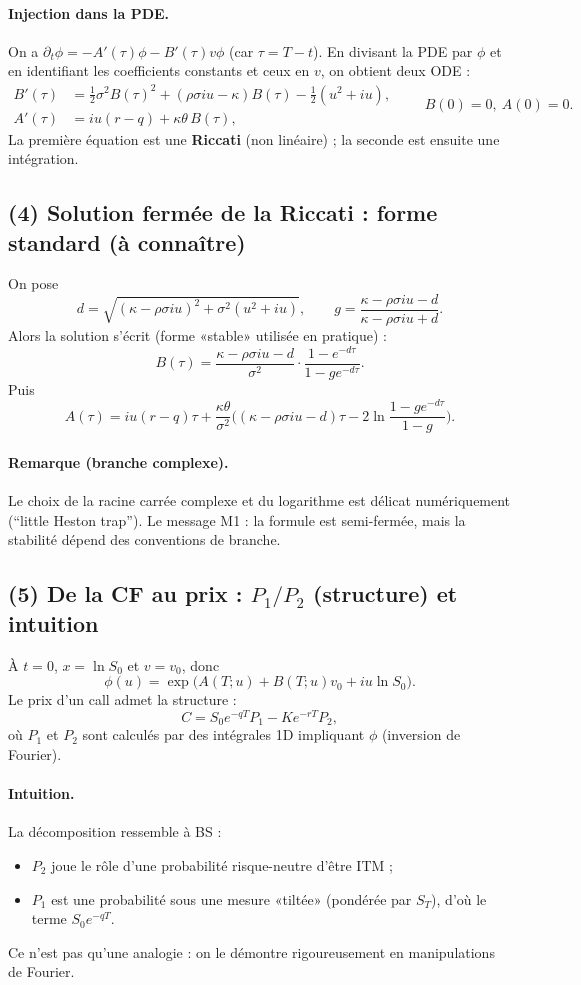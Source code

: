 \paragraph{Injection dans la PDE.}
On a $\partial_t\phi=-A'(\tau)\phi-B'(\tau)v\phi$ (car $\tau=T-t$).
En divisant la PDE par $\phi$ et en identifiant les coefficients constants et ceux en $v$, on obtient deux ODE :
\[
\boxed{
\begin{aligned}
B'(\tau)
&=\tfrac12\sigma^2 B(\tau)^2+(\rho\sigma iu-\kappa)B(\tau)-\tfrac12(u^2+iu),\\
A'(\tau)
&=iu(r-q)+\kappa\theta\,B(\tau),
\end{aligned}}
\qquad B(0)=0,\ A(0)=0.
\]
La première équation est une \textbf{Riccati} (non linéaire) ; la seconde est ensuite une intégration.

\subsection*{(4) Solution fermée de la Riccati : forme standard (à connaître)}
On pose
\[
d=\sqrt{(\kappa-\rho\sigma iu)^2+\sigma^2(u^2+iu)},
\qquad
g=\frac{\kappa-\rho\sigma iu-d}{\kappa-\rho\sigma iu+d}.
\]
Alors la solution s'écrit (forme «stable» utilisée en pratique) :
\[
\boxed{
B(\tau)
=\frac{\kappa-\rho\sigma iu-d}{\sigma^2}\cdot \frac{1-e^{-d\tau}}{1-ge^{-d\tau}}.
}
\]
Puis
\[
\boxed{
A(\tau)
=iu(r-q)\tau+\frac{\kappa\theta}{\sigma^2}\Big((\kappa-\rho\sigma iu-d)\tau-2\ln\frac{1-ge^{-d\tau}}{1-g}\Big).
}
\]
\paragraph{Remarque (branche complexe).}
Le choix de la racine carrée complexe et du logarithme est délicat numériquement (``little Heston trap'').
Le message M1 : la formule est semi-fermée, mais la stabilité dépend des conventions de branche.

\subsection*{(5) De la CF au prix : $P_1/P_2$ (structure) et intuition}
À $t=0$, $x=\ln S_0$ et $v=v_0$, donc
\[
\phi(u)=\exp\big(A(T;u)+B(T;u)v_0+iu\ln S_0\big).
\]
Le prix d'un call admet la structure :
\[
\boxed{
C=S_0e^{-qT}P_1-Ke^{-rT}P_2,
}
\]
où $P_1$ et $P_2$ sont calculés par des intégrales 1D impliquant $\phi$ (inversion de Fourier).
\paragraph{Intuition.}
La décomposition ressemble à BS :
\begin{itemize}[leftmargin=*]
\item $P_2$ joue le rôle d'une probabilité risque-neutre d'être ITM ;
\item $P_1$ est une probabilité sous une mesure «tiltée» (pondérée par $S_T$), d'où le terme $S_0e^{-qT}$.
\end{itemize}
Ce n'est pas qu'une analogie : on le démontre rigoureusement en manipulations de Fourier.

